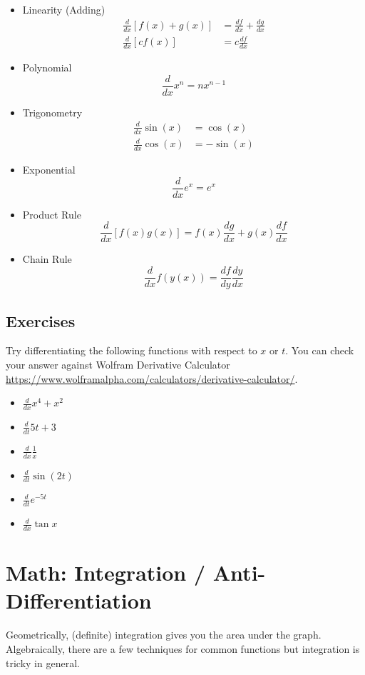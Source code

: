 \documentclass{article}
\begin{document}
\begin{itemize}
    \item Linearity (Adding) 
    \begin{align}
        \frac{d}{dx} [f(x) + g(x)] &= \frac{df}{dx} + \frac{dg}{dx} \\
    \frac{d}{dx} [c f(x)] &= c \frac{df}{dx}
    \end{align}
    \item Polynomial $$ \frac{d}{dx} x^n = nx^{n-1} $$
    \item Trigonometry \begin{align}
        \frac{d}{dx} \sin(x) & = \cos(x) \\
        \frac{d}{dx} \cos(x) & = -\sin(x)
    \end{align}
    \item Exponential $$\frac{d}{dx} e^x = e^x$$
    \item Product Rule $$\frac{d}{dx} [f(x) g(x)] = f(x) \frac{dg}{dx} + g(x) \frac{df}{dx}$$
    \item Chain Rule $$\frac{d}{dx} f(y(x)) = \frac{df}{dy} \frac{dy}{dx}$$
\end{itemize}

\subsection{Exercises}
Try differentiating the following functions with respect to $x$ or $t$. You can check your answer against Wolfram Derivative Calculator \url{https://www.wolframalpha.com/calculators/derivative-calculator/}.

\begin{itemize}
    \item $\frac{d}{dx} x^4 + x^2$
    \item $\frac{d}{dt} 5t + 3$
    \item $\frac{d}{dx} \frac{1}{x}$
    \item $\frac{d}{dt} \sin (2t)$
    \item $\frac{d}{dt} e^{-5t}$
    \item $\frac{d}{dx} \tan x$
\end{itemize}

\section{Math: Integration / Anti-Differentiation }

Geometrically, (definite) integration gives you the area under the graph. Algebraically, there are a few techniques for common functions but integration is tricky in general. 
\end{document}
